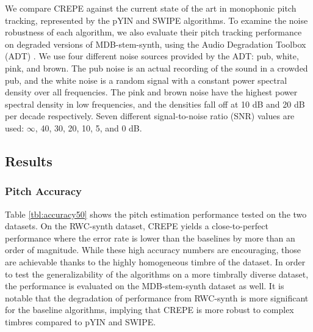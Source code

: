 We compare CREPE against the current state of the art in monophonic pitch tracking, represented by the pYIN \cite{mauch2014pyin} and SWIPE \cite{camacho2008swipe} algorithms.
To examine the noise robustness of each algorithm, we also evaluate their pitch tracking performance on degraded versions of MDB-stem-synth, using the Audio Degradation Toolbox (ADT) \cite{mauch2013adt}.
We use four different noise sources provided by the ADT: pub, white, pink, and brown.
The pub noise is an actual recording of the sound in a crowded pub, 
and the white noise is a random signal with a constant power spectral density over all frequencies.
The pink and brown noise have the highest power spectral density in low frequencies, and the densities fall off at 10 dB and 20 dB per decade respectively.
Seven different signal-to-noise ratio (SNR) values are used: $\infty$, 40, 30, 20, 10, 5, and 0 dB.


\subsection{Results}

\subsubsection{Pitch Accuracy}

Table \ref{tbl:accuracy50} shows the pitch estimation performance tested on the two datasets.
On the RWC-synth dataset, CREPE yields a close-to-perfect performance where the error rate is lower than the baselines by more than an order of magnitude.
While these high accuracy numbers are encouraging, those are achievable thanks to the highly homogeneous timbre of the dataset.
In order to test the generalizability of the algorithms on a more timbrally diverse dataset, the performance is evaluated on the MDB-stem-synth dataset as well.
It is notable that the degradation of performance from RWC-synth is more significant for the baseline algorithms, implying that CREPE is more robust to complex timbres compared to pYIN and SWIPE.

